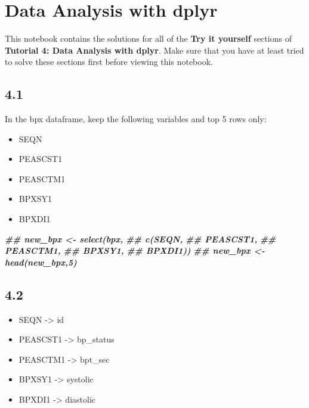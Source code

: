 \documentclass[
]{book}
\newenvironment{Shaded}{\begin{snugshade}}{\end{snugshade}}
\newcommand{\DocumentationTok}[1]{\textcolor[rgb]{0.56,0.35,0.01}{\textbf{\textit{#1}}}}
\providecommand{\tightlist}{%
  \setlength{\itemsep}{0pt}\setlength{\parskip}{0pt}}
\begin{document}
\hypertarget{data-analysis-with-dplyr-1}{%
\section{Data Analysis with dplyr}\label{data-analysis-with-dplyr-1}}

This notebook contains the solutions for all of the \textbf{Try it yourself} sections of \textbf{Tutorial 4: Data Analysis with dplyr}. Make sure that you have at least tried to solve these sections first before viewing this notebook.

\hypertarget{section-17}{%
\subsection{4.1}\label{section-17}}

In the bpx dataframe, keep the following variables and top 5 rows only:

\begin{itemize}
\tightlist
\item
  SEQN
\item
  PEASCST1
\item
  PEASCTM1
\item
  BPXSY1
\item
  BPXDI1
\end{itemize}

\begin{Shaded}
\begin{Highlighting}[]
\DocumentationTok{\#\# new\_bpx \textless{}{-} select(bpx,}
\DocumentationTok{\#\#                    c(SEQN,}
\DocumentationTok{\#\#                     PEASCST1,}
\DocumentationTok{\#\#                     PEASCTM1,}
\DocumentationTok{\#\#                     BPXSY1,}
\DocumentationTok{\#\#                     BPXDI1))}
\DocumentationTok{\#\# new\_bpx \textless{}{-} head(new\_bpx,5)}
\end{Highlighting}
\end{Shaded}

\hypertarget{section-18}{%
\subsection{4.2}\label{section-18}}

\begin{itemize}
\tightlist
\item
  SEQN -\textgreater{} id
\item
  PEASCST1 -\textgreater{} bp\_status
\item
  PEASCTM1 -\textgreater{} bpt\_sec
\item
  BPXSY1 -\textgreater{} systolic
\item
  BPXDI1 -\textgreater{} diastolic
\end{itemize}
\end{document}
